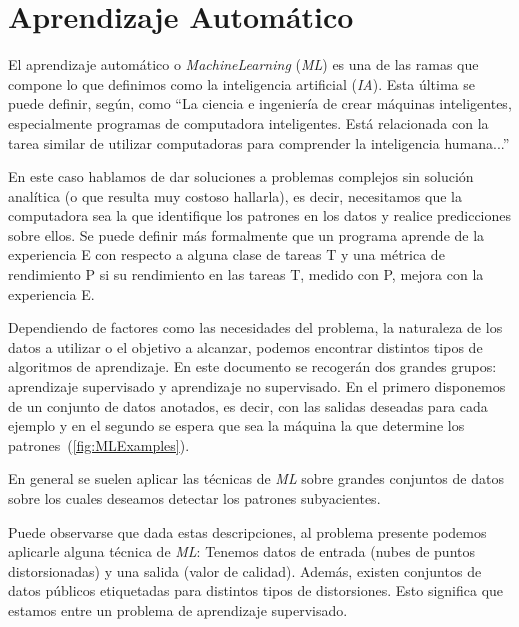 
\section{Aprendizaje Automático}
El aprendizaje automático\cite{IAModernApproach} o \emph{MachineLearning} (\emph{ML}) 
es una de las ramas que compone lo que definimos como 
la inteligencia artificial (\emph{IA}). Esta última se puede definir, 
según\cite{WhatIsAI}, como 
``La ciencia e ingeniería 
de crear máquinas inteligentes, especialmente programas de computadora inteligentes. 
Está relacionada con la tarea similar de utilizar computadoras para comprender 
la inteligencia humana...''

En este caso hablamos de dar soluciones a problemas complejos sin 
solución analítica (o que resulta muy costoso hallarla), es decir, necesitamos que la computadora sea la que identifique
los patrones en los datos y realice predicciones sobre ellos\cite{LearningFromData}.
Se puede definir más formalmente que un programa aprende de la experiencia E con
respecto a alguna clase de tareas T y una métrica de rendimiento P si su
rendimiento en las tareas T, medido con P, mejora con la experiencia E\cite{TomMitchell}.

Dependiendo de factores como las necesidades del problema, la naturaleza
de los datos a utilizar o el objetivo a alcanzar, podemos encontrar distintos tipos de
algoritmos de aprendizaje. En este documento se recogerán dos grandes grupos: aprendizaje supervisado 
y aprendizaje no supervisado. En el primero disponemos de un conjunto de datos 
anotados, es decir, con las salidas deseadas para cada ejemplo y en el segundo 
se espera que sea la máquina la que determine los patrones~(\ref{fig:MLExamples}). 

En general se suelen aplicar las técnicas de \emph{ML} sobre grandes conjuntos 
de datos sobre los cuales deseamos detectar los patrones subyacientes\cite{
DataMiningHandbook}.

Puede observarse que dada estas descripciones, al problema presente podemos 
aplicarle alguna técnica de \emph{ML}: Tenemos datos de entrada (nubes de puntos 
distorsionadas) y una salida (valor de calidad). Además, existen conjuntos de 
datos públicos etiquetadas para distintos tipos de distorsiones. Esto significa que
estamos entre un problema de aprendizaje supervisado.

